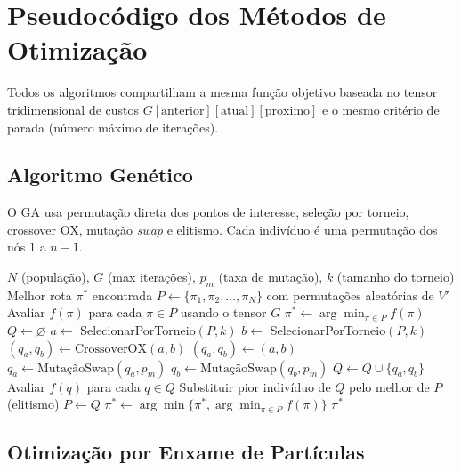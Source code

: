 \chapter[Pseudocódigo dos Métodos]{Pseudocódigo dos Métodos de Otimização}
\label{ape:pseudocodigo}

Todos os algoritmos compartilham a mesma função objetivo baseada no tensor tridimensional de custos $G[\text{anterior}][\text{atual}][\text{proximo}]$ e o mesmo critério de parada (número máximo de iterações).

\section{Algoritmo Genético}

O \ac{GA} usa permutação direta dos pontos de interesse, seleção por torneio, crossover \ac{OX}, mutação \textit{swap} e elitismo. Cada indivíduo é uma permutação dos nós $1$ a $n-1$.

\begin{algorithm}[htbp]
\caption{Algoritmo Genético para TSP-SD-ATP}
\label{alg:ga}
\begin{algorithmic}[1]
\REQUIRE $N$ (população), $G$ (max iterações), $p_m$ (taxa de mutação), $k$ (tamanho do torneio)
\ENSURE Melhor rota $\pi^*$ encontrada
\STATE $P \leftarrow \{\pi_1, \pi_2, \ldots, \pi_N\}$ com permutações aleatórias de $V'$
\STATE Avaliar $f(\pi)$ para cada $\pi \in P$ usando o tensor $G$
\STATE $\pi^* \leftarrow \arg\min_{\pi \in P} f(\pi)$
  \STATE $Q \leftarrow \varnothing$
    \STATE $a \leftarrow$ SelecionarPorTorneio$(P, k)$
    \STATE $b \leftarrow$ SelecionarPorTorneio$(P, k)$
      \STATE $(q_a, q_b) \leftarrow \text{CrossoverOX}(a, b)$
    \ELSE
      \STATE $(q_a, q_b) \leftarrow (a, b)$
    \ENDIF
    \STATE $q_a \leftarrow \text{MutaçãoSwap}(q_a, p_m)$
    \STATE $q_b \leftarrow \text{MutaçãoSwap}(q_b, p_m)$
    \STATE $Q \leftarrow Q \cup \{q_a, q_b\}$
  \ENDWHILE
  \STATE Avaliar $f(q)$ para cada $q \in Q$
  \STATE Substituir pior indivíduo de $Q$ pelo melhor de $P$ (elitismo)
  \STATE $P \leftarrow Q$
  \STATE $\pi^* \leftarrow \arg\min\{\pi^*, \arg\min_{\pi \in P} f(\pi)\}$
\ENDFOR
\RETURN $\pi^*$
\end{algorithmic}
\end{algorithm}

\section{Otimização por Enxame de Partículas}

